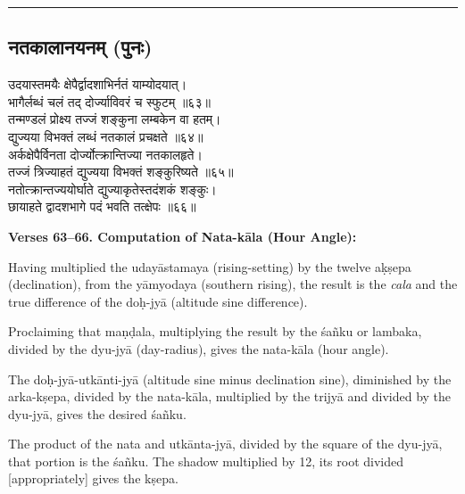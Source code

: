\documentclass[11pt,a4paper]{article}
\newcommand{\longline}{\noindent\rule{\textwidth}{0.4pt}}
\newcommand{\dev}[1]{{\devanagarifont #1}}
\newcommand{\sectsep}{\par\vspace{0.8em}\longline\vspace{0.8em}}
\begin{document}
\sectsep

\subsection{\dev{नतकालानयनम् (पुनः)}}

\begin{minipage}[t]{0.48\textwidth}
\small\devanagarifont
उदयास्तमयैः क्षेपैर्द्वादशाभिर्नतं याम्योदयात्।\\
भागैर्लब्धं चलं तद् दोर्ज्याविवरं च स्फुटम् ॥६३॥\\[0.5em]
तन्मण्डलं प्रोक्ष्य तज्जं शङ्कुना लम्बकेन वा हतम्।\\
द्युज्यया विभक्तं लब्धं नतकालं प्रचक्षते ॥६४॥\\[0.5em]
अर्कक्षेपैर्विनता दोर्ज्योत्क्रान्तिज्या नतकालहृते।\\
तज्जं त्रिज्याहतं द्युज्यया विभक्तं शङ्कुरिष्यते ॥६५॥\\[0.5em]
नतोत्क्रान्तज्ययोर्घाते द्युज्याकृतेस्तदंशकं शङ्कुः।\\
छायाहते द्वादशभागे पदं भवति तत्क्षेपः ॥६६॥
\end{minipage}%
\hfill
\begin{minipage}[t]{0.48\textwidth}
\small
\textbf{Verses 63--66. Computation of Nata-k\=ala (Hour Angle):}

Having multiplied the uday\=astamaya (rising-setting) by the twelve a\d{k}\d{s}epa (declination), from the y\=amyodaya (southern rising), the result is the \textit{cala} and the true difference of the do\d{h}-jy\=a (altitude sine difference).

Proclaiming that ma\d{n}\d{d}ala, multiplying the result by the \'sa\~nku or lambaka, divided by the dyu-jy\=a (day-radius), gives the nata-k\=ala (hour angle).

The do\d{h}-jy\=a-utk\=anti-jy\=a (altitude sine minus declination sine), diminished by the arka-k\d{s}epa, divided by the nata-k\=ala, multiplied by the trijy\=a and divided by the dyu-jy\=a, gives the desired \'sa\~nku.

The product of the nata and utk\=anta-jy\=a, divided by the square of the dyu-jy\=a, that portion is the \'sa\~nku. The shadow multiplied by 12, its root divided [appropriately] gives the k\d{s}epa.
\end{minipage}
\end{document}
